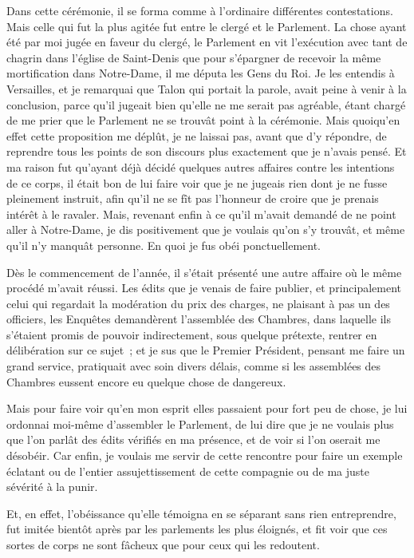 \documentclass[french,twoside]{book} %
\begin{document}
Dans cette cérémonie, il se forma comme à l’ordinaire différentes contestations. Mais celle qui fut la plus agitée fut entre le clergé et le Parlement. La chose ayant été par moi jugée en faveur du clergé, le Parlement en vit l’exécution avec tant de chagrin dans l’église de Saint-Denis que pour s’épargner de recevoir la même mortification dans Notre-Dame, il me députa les Gens du Roi. Je les entendis à Versailles, et je remarquai que Talon qui portait la parole, avait peine à venir à la conclusion, parce qu’il jugeait bien qu’elle ne me serait pas agréable, étant chargé de me prier que le Parlement ne se trouvât point à la cérémonie. Mais quoiqu’en effet cette proposition me déplût, je ne laissai pas, avant que d’y répondre, de reprendre tous les points de son discours plus exactement que je n’avais pensé. Et ma raison fut qu’ayant déjà décidé quelques autres affaires contre les intentions de ce corps, il était bon de lui faire voir que je ne jugeais rien dont je ne fusse pleinement instruit, afin qu’il ne se fît pas l’honneur de croire que je prenais intérêt à le ravaler. Mais, revenant enfin à ce qu’il m’avait demandé de ne point aller à Notre-Dame, je dis positivement que je voulais qu’on s’y trouvât, et même qu’il n’y manquât personne. En quoi je fus obéi ponctuellement.\par
Dès le commencement de l’année, il s’était présenté une autre affaire où le même procédé m’avait réussi. Les édits que je venais de faire publier, et principalement celui qui regardait la modération du prix des charges, ne plaisant à pas un des officiers, les Enquêtes demandèrent l’assemblée des Chambres, dans laquelle ils s’étaient promis de pouvoir indirectement, sous quelque prétexte, rentrer en délibération sur ce sujet ; et je sus que le Premier Président, pensant me faire un grand service, pratiquait avec soin divers délais, comme si les assemblées des Chambres eussent encore eu quelque chose de dangereux.\par
Mais pour faire voir qu’en mon esprit elles passaient pour fort peu de chose, je lui ordonnai moi-même d’assembler le Parlement, de lui dire que je ne voulais plus que l’on parlât des édits vérifiés en ma présence, et de voir si l’on oserait me désobéir. Car enfin, je voulais me servir de cette rencontre pour faire un exemple éclatant ou de l’entier assujettissement de cette compagnie ou de ma juste sévérité à la punir.\par
Et, en effet, l’obéissance qu’elle témoigna en se séparant sans rien entreprendre, fut imitée bientôt après par les parlements les plus éloignés, et fit voir que ces sortes de corps ne sont fâcheux que pour ceux qui les redoutent.\par
\end{document}

